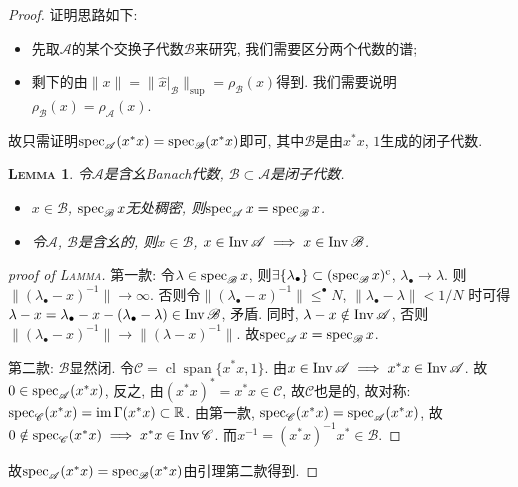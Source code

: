 \documentclass{ctexart}
\makeatletter
\newcommand\<{\@ifstar\@angle@star\@angle@nostar}
\newtheorem{lemma}{{\scshape Lemma}}[section]
\makeatother
\begin{document}
\begin{proof}
    证明思路如下:
    \begin{itemize}
        \item 先取$\mathscr A$的某个交换\C*子代数$\mathscr B$来研究, 我们需要区分两个代数的谱;
        \item 剩下的由$\|x\|=\|\hat{x}|_{\mathscr B}\|_{\sup}=\rho _{\mathscr B}(x)$得到. 我们需要说明$\rho _{\mathscr B}(x)=\rho _{\mathscr A}(x)$.
    \end{itemize}
    故只需证明$\sp_{\mathscr A}(x^*x)=\sp_{\mathscr B}(x^*x)$即可, 其中$\mathscr B$是由$x^*x$, $1$生成的\C*闭子代数.
    \begin{lemma}
        令$\mathscr A$是含幺Banach代数, $\mathscr B\subset\mathscr A$是闭子代数.
        \begin{itemize}
            \item $x\in\mathscr B$, $\sp_{\mathscr B}x$无处稠密, 则$\sp_{\mathscr A}x=\sp_{\mathscr B}x$.
            \item 令$\mathscr A$, $\mathscr B$是\C*含幺的, 则$x\in\mathscr B$, $x\in\Inv\mathscr A\implies x\in\Inv\mathscr B$.
        \end{itemize}
    \end{lemma}
    \begin{proof}[proof of \textsc{Lamma}]
        第一款: 令$\lambda \in\sp_{\mathscr B}x$, 则$\exists \{\lambda_\bullet\}\subset (\sp_{\mathscr B}x)^\complement$, $\lambda_\bullet\to \lambda$. 则$\|(\lambda _\bullet-x)^{-1} \|\to \infty$. 否则令$\|(\lambda _\bullet-x)^{-1} \|\leqslant ^\bullet N$, $\|\lambda _\bullet-\lambda\|<1 / N$ 时可得$\lambda -x = \lambda _\bullet - x - (\lambda _\bullet-\lambda) \in\Inv\mathscr B$, 矛盾. 同时, $\lambda -x \notin\Inv\mathscr A$, 否则$\|(\lambda _\bullet-x)^{-1} \|\to \|(\lambda -x)^{-1} \|$. 故$\sp_{\mathscr A}x=\sp_{\mathscr B}x$.

        第二款: $\mathscr B$显然闭. 令$\mathscr C=\operatorname{cl}\operatorname{span}\{x^*x,1\}$. 由$x\in\Inv\mathscr A\implies x^*x\in\Inv\mathscr A$. 故$0\in\sp_{\mathscr A}(x^*x)$, 反之, 由$(x^*x)^*=x^*x\in\mathscr C$, 故$\mathscr C$也是\C*的, 故对称: $\sp_{\mathscr C}(x^*x)=\operatorname{im}\Gamma (x^*x)\subset\mathbb R$. 由第一款, $\sp_{\mathscr C}(x^*x)=\sp_{\mathscr A}(x^*x)$, 故$0\notin\sp_{\mathscr C}(x^*x)\implies x^*x\in\Inv\mathscr C$. 而$x^{-1} = (x^*x)^{-1} x^*\in\mathscr B$.
    \end{proof}
    故$\sp_{\mathscr A}(x^*x)=\sp_{\mathscr B}(x^*x)$由引理第二款得到.
\end{proof}
\end{document}

